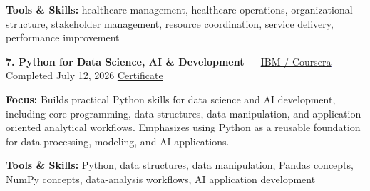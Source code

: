 \documentclass[9pt,letterpaper]{extarticle}
\begin{document}
{\small\textbf{Tools \& Skills:} healthcare management, healthcare operations, organizational structure, stakeholder management, resource coordination, service delivery, performance improvement\par}
\vspace{2pt}
\noindent\textbf{7. Python for Data Science, AI \& Development} {\small --- \textcolor{blue}{\underline{\href{https://www.coursera.org/account/accomplishments/verify/WRA89JEJU8EE}{IBM / Coursera}}} \textbar{} Completed \textbar{} July 12, 2026 \textbar{} \textcolor{blue}{\underline{\href{https://waseemraza844.github.io/portfolio/certificates/cloud-devops/C7. Coursera WRA89JEJU8EE.pdf}{Certificate}}}}\par
\textbf{Focus:} Builds practical Python skills for data science and AI development, including core programming, data structures, data manipulation, and application-oriented analytical workflows. Emphasizes using Python as a reusable foundation for data processing, modeling, and AI applications.\par
{\small\textbf{Tools \& Skills:} Python, data structures, data manipulation, Pandas concepts, NumPy concepts, data-analysis workflows, AI application development\par}
\vspace{2pt}
\end{document}
